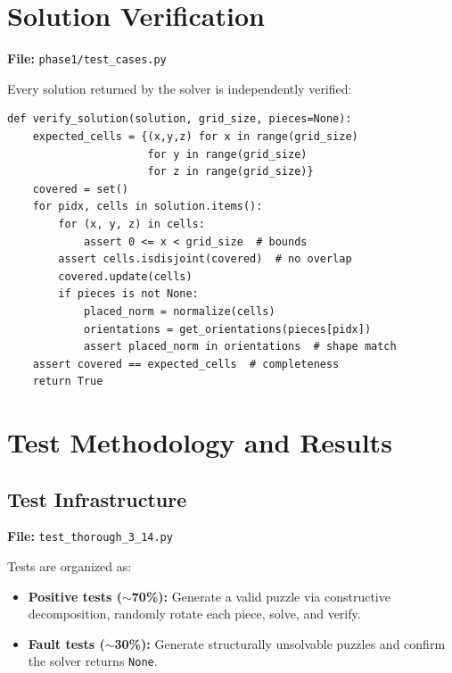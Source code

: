 \documentclass[11pt]{article}
\begin{document}
\section{Solution Verification}

\textbf{File:} \texttt{phase1/test\_cases.py}

Every solution returned by the solver is independently verified:

\begin{lstlisting}
def verify_solution(solution, grid_size, pieces=None):
    expected_cells = {(x,y,z) for x in range(grid_size)
                      for y in range(grid_size)
                      for z in range(grid_size)}
    covered = set()
    for pidx, cells in solution.items():
        for (x, y, z) in cells:
            assert 0 <= x < grid_size  # bounds
        assert cells.isdisjoint(covered)  # no overlap
        covered.update(cells)
        if pieces is not None:
            placed_norm = normalize(cells)
            orientations = get_orientations(pieces[pidx])
            assert placed_norm in orientations  # shape match
    assert covered == expected_cells  # completeness
    return True
\end{lstlisting}

\section{Test Methodology and Results}

\subsection{Test Infrastructure}

\textbf{File:} \texttt{test\_thorough\_3\_14.py}

Tests are organized as:
\begin{itemize}[nosep]
  \item \textbf{Positive tests ($\sim$70\%):} Generate a valid puzzle via constructive decomposition, randomly rotate each piece, solve, and verify.
  \item \textbf{Fault tests ($\sim$30\%):} Generate structurally unsolvable puzzles and confirm the solver returns \texttt{None}.
\end{itemize}
\end{document}
